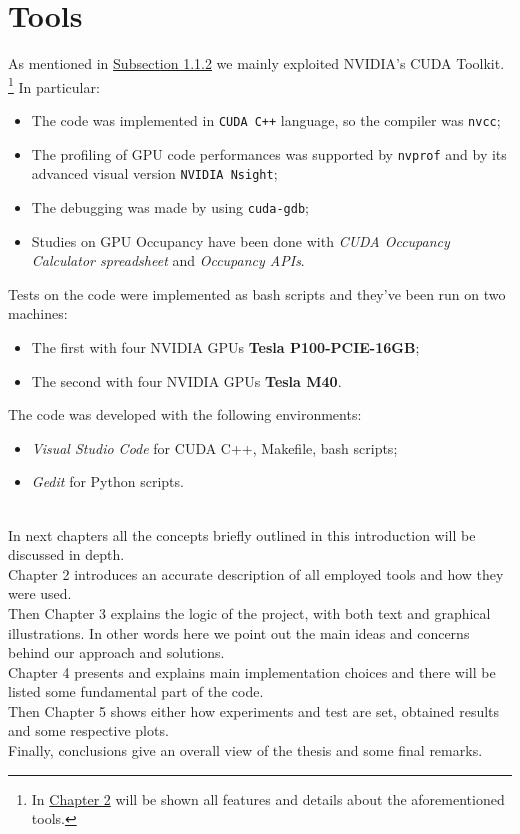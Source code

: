 \section{Tools}
\label{sect:tools}
	As mentioned in \hyperref[subs:otherApps]{Subsection 1.1.2} we mainly exploited NVIDIA's CUDA Toolkit. 
	\footnote{In \hyperref[chap:tools]{Chapter 2} will be shown all features and details about the aforementioned tools.}	
	In particular:
	\begin{itemize}
		\item The code was implemented in \texttt{CUDA C++} language, so the compiler was \texttt{nvcc};	
			
		\item The profiling of GPU code performances was supported by \texttt{nvprof} and by its advanced visual version \texttt{NVIDIA Nsight};
				
		\item The debugging was made by using \texttt{cuda-gdb};
				
		\item Studies on GPU Occupancy have been done with \textit{CUDA Occupancy Calculator spreadsheet} and \textit{Occupancy APIs}.
	\end{itemize}
	Tests on the code were implemented as bash scripts and they've been run on two machines:	
	\begin{itemize}
		\item The first with four NVIDIA GPUs \textbf{Tesla P100-PCIE-16GB};
		
		\item The second with four NVIDIA GPUs \textbf{Tesla M40}.
	\end{itemize}
	The code was developed with the following environments:
	\begin{itemize}
		\item \textit{Visual Studio Code} for CUDA C++, Makefile, bash scripts;
		\item \textit{Gedit} for Python scripts.\\\\
	\end{itemize}
		
In next chapters all the concepts briefly outlined in this introduction will be discussed in depth.\\
Chapter 2 introduces an accurate description of all employed tools and how they were used.\\
Then Chapter 3 explains the logic of the project, with both text and graphical illustrations. In other words here we point out the main ideas and concerns behind our approach and solutions.\\
Chapter 4 presents and explains main implementation choices and there will be listed some fundamental part of the code.\\ 
Then Chapter 5 shows either how experiments and test are set, obtained results and some respective plots.\\
Finally, conclusions give an overall view of the thesis and some final remarks. 
